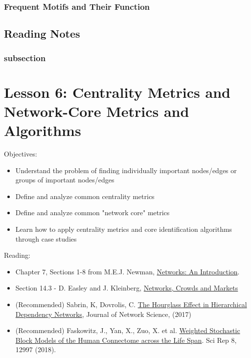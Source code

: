 \documentclass[11pt]{scrartcl} %
\begin{document}
\subsubsection{Frequent Motifs and Their Function}
\textbf{}

\subsection{Reading Notes}

\subsubsection{subsection}
\subsubsection{}
\textbf{}



\section{Lesson 6: Centrality Metrics and Network-Core Metrics and Algorithms}

Objectives:
\begin{itemize}
	\item Understand the problem of finding individually important nodes/edges or groups of important nodes/edges
	\item Define and analyze common centrality metrics
	\item Define and analyze common "network core" metrics
	\item Learn how to apply centrality metrics and core identification algorithms through case studies
\end{itemize}

Reading:
\begin{itemize}
	\item Chapter 7, Sections 1-8 from M.E.J. Newman, \href{https://www.amazon.com/Networks-Mark-Newman/dp/0198805098/}{Networks: An Introduction}.
	\item Section 14.3 - D. Easley and J. Kleinberg, \href{https://www.cs.cornell.edu/home/kleinber/networks-book/networks-book.pdf}{Networks, Crowds and Markets}
	\item (Recommended) Sabrin, K, Dovrolis, C. \href{https://www.cambridge.org/core/journals/network-science/article/hourglass-effect-in-hierarchical-dependency-networks/DDBCA83D16CA74B827DAB66A98CC906A}{The Hourglass Effect in Hierarchical Dependency Networks}, Journal of Network Science, (2017)
	\item (Recommended) Faskowitz, J., Yan, X., Zuo, X. et al. \href{https://www.nature.com/articles/s41598-018-31202-1}{Weighted Stochastic Block Models of the Human Connectome across the Life Span}. Sci Rep 8, 12997 (2018).
\end{itemize}
\end{document}
